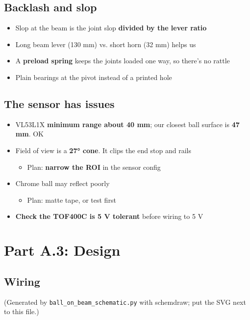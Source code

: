 \documentclass[11pt]{article}
\begin{document}
\subsection*{Backlash and slop}
\label{sec:org343cce6}
\begin{itemize}
\item Slop at the beam is the joint slop \textbf{divided by the lever ratio}
\item Long beam lever (130 mm) vs. short horn (32 mm) helps us
\item A \textbf{preload spring} keeps the joints loaded one way, so there's no rattle
\item Plain bearings at the pivot instead of a printed hole
\end{itemize}
\subsection*{The sensor has issues}
\label{sec:org66f297e}
\begin{itemize}
\item VL53L1X \textbf{minimum range about 40 mm}; our closest ball surface is \textbf{47 mm}. OK
\item Field of view is a \textbf{27° cone}. It clips the end stop and rails
\begin{itemize}
\item Plan: \textbf{narrow the ROI} in the sensor config
\end{itemize}
\item Chrome ball may reflect poorly
\begin{itemize}
\item Plan: matte tape, or test first
\end{itemize}
\item \textbf{Check the TOF400C is 5 V tolerant} before wiring to 5 V
\end{itemize}
\section*{Part A.3: Design}
\label{sec:org5b644e7}
\subsection*{Wiring}
\label{sec:org72ac05e}
\begin{center}

\end{center}

(Generated by \texttt{ball\_on\_beam\_schematic.py} with schemdraw; put the SVG next to this file.)
\end{document}
